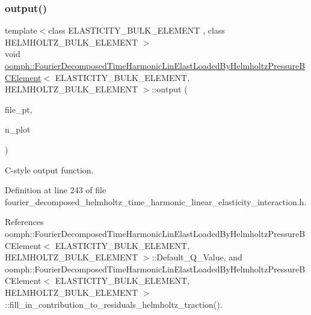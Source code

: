\subsubsection{\texorpdfstring{output()}{output()}\hspace{0.1cm}{\footnotesize\ttfamily [4/4]}}
{\footnotesize\ttfamily template$<$class E\+L\+A\+S\+T\+I\+C\+I\+T\+Y\+\_\+\+B\+U\+L\+K\+\_\+\+E\+L\+E\+M\+E\+NT , class H\+E\+L\+M\+H\+O\+L\+T\+Z\+\_\+\+B\+U\+L\+K\+\_\+\+E\+L\+E\+M\+E\+NT $>$ \\
void \hyperlink{classoomph_1_1FourierDecomposedTimeHarmonicLinElastLoadedByHelmholtzPressureBCElement}{oomph\+::\+Fourier\+Decomposed\+Time\+Harmonic\+Lin\+Elast\+Loaded\+By\+Helmholtz\+Pressure\+B\+C\+Element}$<$ E\+L\+A\+S\+T\+I\+C\+I\+T\+Y\+\_\+\+B\+U\+L\+K\+\_\+\+E\+L\+E\+M\+E\+NT, H\+E\+L\+M\+H\+O\+L\+T\+Z\+\_\+\+B\+U\+L\+K\+\_\+\+E\+L\+E\+M\+E\+NT $>$\+::output (\begin{DoxyParamCaption}\item[{F\+I\+LE $\ast$}]{file\+\_\+pt,  }\item[{const unsigned \&}]{n\+\_\+plot }\end{DoxyParamCaption})\hspace{0.3cm}{\ttfamily [inline]}}



C-\/style output function. 



Definition at line 243 of file fourier\+\_\+decomposed\+\_\+helmholtz\+\_\+time\+\_\+harmonic\+\_\+linear\+\_\+elasticity\+\_\+interaction.\+h.



References oomph\+::\+Fourier\+Decomposed\+Time\+Harmonic\+Lin\+Elast\+Loaded\+By\+Helmholtz\+Pressure\+B\+C\+Element$<$ E\+L\+A\+S\+T\+I\+C\+I\+T\+Y\+\_\+\+B\+U\+L\+K\+\_\+\+E\+L\+E\+M\+E\+N\+T, H\+E\+L\+M\+H\+O\+L\+T\+Z\+\_\+\+B\+U\+L\+K\+\_\+\+E\+L\+E\+M\+E\+N\+T $>$\+::\+Default\+\_\+\+Q\+\_\+\+Value, and oomph\+::\+Fourier\+Decomposed\+Time\+Harmonic\+Lin\+Elast\+Loaded\+By\+Helmholtz\+Pressure\+B\+C\+Element$<$ E\+L\+A\+S\+T\+I\+C\+I\+T\+Y\+\_\+\+B\+U\+L\+K\+\_\+\+E\+L\+E\+M\+E\+N\+T, H\+E\+L\+M\+H\+O\+L\+T\+Z\+\_\+\+B\+U\+L\+K\+\_\+\+E\+L\+E\+M\+E\+N\+T $>$\+::fill\+\_\+in\+\_\+contribution\+\_\+to\+\_\+residuals\+\_\+helmholtz\+\_\+traction().

\mbox{\label{classoomph_1_1FourierDecomposedTimeHarmonicLinElastLoadedByHelmholtzPressureBCElement_a874a6bc7470c0ba4de2b39f8444ed4e2}} 
